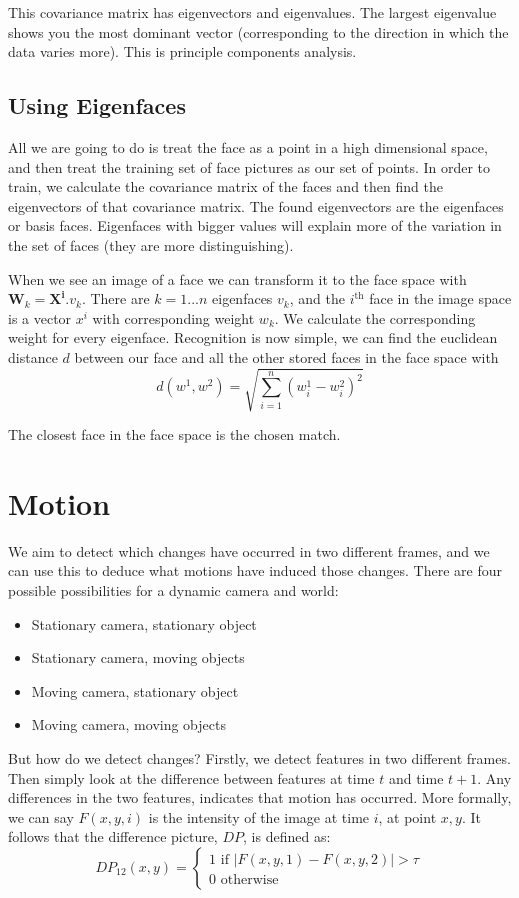 \documentclass{article}
\begin{document}
	This covariance matrix has eigenvectors and eigenvalues. The largest eigenvalue shows you the most dominant vector (corresponding to the direction in which the data varies more). This is principle components analysis.
	
	\subsection{Using Eigenfaces}
	All we are going to do is treat the face as a point in a high dimensional space, and then treat the training set of face pictures as our set of points. In order to train, we calculate the covariance matrix of the faces and then find the eigenvectors of that covariance matrix. The found eigenvectors are the eigenfaces or basis faces. Eigenfaces with bigger values will explain more of the variation in the set of faces (they are more distinguishing).
	
	\par
	When we see an image of a face we can transform it to the face space with $\mathbf{W}_{k} = \mathbf{X}^{\mathbf{i}} . \mathit{v}_{k}$. There are $k=1...n$ eigenfaces $v_{k}$, and the $i^{\text{th}}$ face in the image space is a vector $x^{i}$ with corresponding weight $w_{k}$. We calculate the corresponding weight for every eigenface. Recognition is now simple, we can find the euclidean distance $d$ between our face and all the other stored faces in the face space with \[ d(w^{1}, w^{2}) = \sqrt{\sum_{i=1}^{n}(w_{i}^{1} - w_{i}^{2})^{2}} \]
	
	The closest face in the face space is the chosen match.
	\section{Motion}
	We aim to detect which changes have occurred in two different frames, and we can use this to deduce what motions have induced those changes. There are four possible possibilities for a dynamic camera and world:
	\begin{itemize}
		\item Stationary camera, stationary object
		\item Stationary camera, moving objects
		\item Moving camera, stationary object
		\item Moving camera, moving objects
	\end{itemize}
	
	But how do we detect changes? Firstly, we detect features in two different frames. Then simply look at the difference between features at time $t$ and time $t + 1$. Any differences in the two features, indicates that motion has occurred. More formally, we can say $F(x, y, i)$ is the intensity of the image at time $i$, at point $x, y$. It follows that the difference picture, $DP$, is defined as:
	\[ DP_{12}(x, y) = \begin{cases}
		1 \text{ if } |F(x, y, 1) - F(x, y, 2)| > \tau \\
		0 \text{ otherwise}
		\end{cases} \]
		
\end{document}

